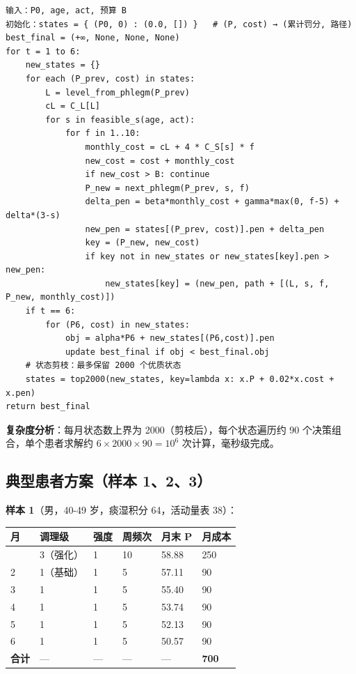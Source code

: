\documentclass{MathorCupmodeling}
\begin{document}
\begin{verbatim}
输入：P0, age, act, 预算 B
初始化：states = { (P0, 0) : (0.0, []) }   # (P, cost) → (累计罚分, 路径)
best_final = (+∞, None, None, None)
for t = 1 to 6:
    new_states = {}
    for each (P_prev, cost) in states:
        L = level_from_phlegm(P_prev)
        cL = C_L[L]
        for s in feasible_s(age, act):
            for f in 1..10:
                monthly_cost = cL + 4 * C_S[s] * f
                new_cost = cost + monthly_cost
                if new_cost > B: continue
                P_new = next_phlegm(P_prev, s, f)
                delta_pen = beta*monthly_cost + gamma*max(0, f-5) + delta*(3-s)
                new_pen = states[(P_prev, cost)].pen + delta_pen
                key = (P_new, new_cost)
                if key not in new_states or new_states[key].pen > new_pen:
                    new_states[key] = (new_pen, path + [(L, s, f, P_new, monthly_cost)])
    if t == 6:
        for (P6, cost) in new_states:
            obj = alpha*P6 + new_states[(P6,cost)].pen
            update best_final if obj < best_final.obj
    # 状态剪枝：最多保留 2000 个优质状态
    states = top2000(new_states, key=lambda x: x.P + 0.02*x.cost + x.pen)
return best_final
\end{verbatim}

\textbf{复杂度分析}：每月状态数上界为 2000（剪枝后），每个状态遍历约 90 个决策组合，单个患者求解约 \(6 \times 2000 \times 90 = 10^6\) 次计算，毫秒级完成。

\subsection{典型患者方案（样本 1、2、3）}\label{ux5178ux578bux60a3ux8005ux65b9ux6848ux6837ux672c-123}

\textbf{样本 1}（男，40-49 岁，痰湿积分 64，活动量表 38）：

\begin{longtable}[]{@{}llllll@{}}
\toprule\noalign{}
月 & 调理级 & 强度 & 周频次 & 月末 P & 月成本 \\
\midrule\noalign{}
\endhead
\bottomrule\noalign{}
\endlastfoot
1 & 3（强化） & 1 & 10 & 58.88 & 250 \\
2 & 1（基础） & 1 & 5 & 57.11 & 90 \\
3 & 1 & 1 & 5 & 55.40 & 90 \\
4 & 1 & 1 & 5 & 53.74 & 90 \\
5 & 1 & 1 & 5 & 52.13 & 90 \\
6 & 1 & 1 & 5 & 50.57 & 90 \\
\textbf{合计} & --- & --- & --- & --- & \textbf{700} \\
\end{longtable}
\end{document}
